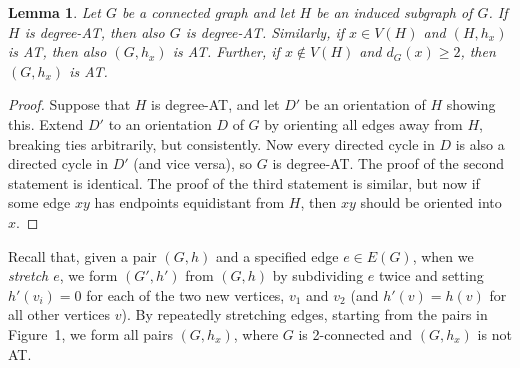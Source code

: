 \documentclass[12pt]{article}
\theoremstyle{plain}
\newtheorem{lem}[thm]{Lemma}
\theoremstyle{definition}
\theoremstyle{remark}
\begin{document}
\begin{lem}\label{InducedSubgraph}
Let $G$ be a connected graph and let $H$ be an induced subgraph of $G$.  If $H$
is degree-AT, then
also $G$ is degree-AT.  
Similarly, if $x\in V(H)$ and $(H,h_x)$ is AT, then also $(G,h_x)$ is AT.
Further, if $x\notin V(H)$ and $d_G(x)\ge 2$, then $(G,h_x)$ is AT.  
\end{lem}
\begin{proof}
Suppose that $H$ is degree-AT, and let $D'$ be an orientation of $H$ showing
this.  Extend $D'$ to an orientation $D$ of $G$ by orienting all edges away from
$H$, breaking ties arbitrarily, but consistently.  Now every directed cycle in
$D$ is also a directed cycle in $D'$ (and vice versa), so $G$ is degree-AT.
The proof of the second statement is identical.  The proof of the third
statement is similar, but now if some edge $xy$ has endpoints equidistant from
$H$, then $xy$ should be oriented into $x$.
\end{proof}

Recall that, given a pair $(G,h)$ and a specified edge $e\in E(G)$, when we
\emph{stretch $e$}, we form $(G',h')$ from $(G,h)$ by subdividing $e$ twice
and setting $h'(v_i)=0$ for each of the two new vertices, $v_1$ and $v_2$
(and $h'(v)=h(v)$ for all other vertices $v$).  By repeatedly stretching edges,
starting from the pairs in Figure~1, we form all pairs $(G,h_x)$, where $G$ is
2-connected and $(G,h_x)$ is not AT.  
\end{document}
